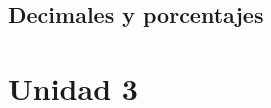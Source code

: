 \documentclass[12pt,addpoints,answers]{repaso}
\begin{document}
\begin{questions}
	\subsection*{Decimales y porcentajes}

	\section*{Unidad 3}


\end{questions}
\end{document}
